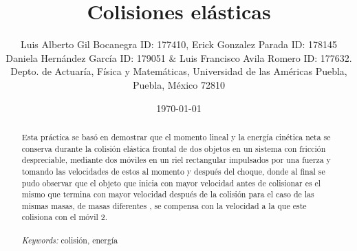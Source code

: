 \documentclass{article}
\begin{document}

\renewcommand{\footrulewidth}{1pt}
\renewcommand{\tablename}{Tabla}
\renewcommand{\figurename}{Figura}


\title{Colisiones elásticas}
\author{\small{Luis Alberto Gil Bocanegra ID: 177410, Erick Gonzalez Parada ID: 178145}\\
 \small{Daniela Hernández García ID: 179051 $\&$ Luis Francisco Avila Romero ID: 177632.}\\		%
	   \small{Depto. de Actuaría, Física y Matemáticas, Universidad de las Américas Puebla, Puebla, M\'exico 72810}}
\date{\small{\today}}

\maketitle


\begin{abstract}
Esta práctica se basó en demostrar que el momento lineal y la energía cinética neta se conserva durante
la colisión elástica frontal de dos objetos en un sistema con fricción despreciable, mediante dos
móviles en un riel rectangular impulsados por una fuerza y tomando las velocidades de estos al momento
y después del choque, donde al final se pudo observar que el objeto que inicia con mayor velocidad antes de colisionar es el mismo que termina con mayor velocidad después de la colisión para el
caso de las mismas masas, de masas diferentes , se compensa con la velocidad a la que este colisiona con el móvil 2.
\\
\\
{\it Keywords:}  colisión, energía  
\\
\\
\end{abstract}
\end{document}
